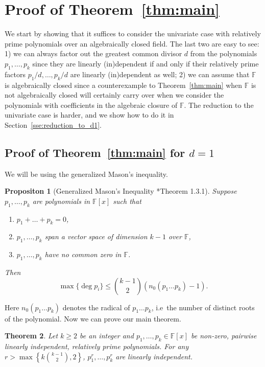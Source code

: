 \documentclass{amsart}
\newtheorem{theorem}{Theorem}
\newtheorem{proposition}[theorem]{Propositon}
\theoremstyle{definition}
\theoremstyle{remark}
\numberwithin{equation}{section}
\newcommand{\F}{\mathbb{F}}
\begin{document}
\section{Proof of Theorem~\ref{thm:main}}
\label{section:proof}

We start by showing that it suffices to consider the univariate case with
relatively prime polynomials over an algebraically closed field. The last two
are easy to see: 1) we can always factor out the greatest common divisor $ d $
from the polynomials $ p_1, \ldots, p_k $ since they are linearly (in)dependent
if and only if their relatively prime factors $ p_1/d, \ldots, p_k/d $ are
linearly (in)dependent as well; 2) we can assume that $ \F $ is algebraically
closed since a counterexample to Theorem~\ref{thm:main} when $ \F $ is not
algebraically closed will certainly carry over when we consider the polynomials
with coefficients in the algebraic closure of $ \F $. The reduction to the
univariate case is harder, and we show how to do it in Section~\ref{sse:reduction_to_d1}. 

\subsection{Proof of Theorem~\ref{thm:main} for $ d=1 $}
\label{sse:proof_for_d1}
We will be using the generalized Mason's inequality.
\begin{proposition}[Generalized Mason's Inequality \cite{Sheppard14}*{Theorem
	1.3.1}]
	\label{prop:mason}
	Suppose $ p_1, \ldots, p_k $ are polynomials in $ \F[x] $ such that
	\begin{enumerate}
		\item
			$ p_1 + \ldots + p_k = 0 $,

		\item
			$ p_1, \ldots, p_k $ span a vector space of dimension $ k-1 $
			over $ \F $,

		\item 
			$ p_1, \ldots, p_k $ have no common zero in $ \F $.
	\end{enumerate}

	Then
	\[
		\max\{ \deg p_i \} \leq  \binom{k-1}{2}(n_0 (p_1\ldots p_k)
		- 1).
	\]
\end{proposition}
Here $ n_0 (p_1\ldots p_k) $ denotes the radical of $ p_1\ldots p_k $, i.e\ the
number of distinct roots of the polynomial. Now we can prove our main 
theorem.
\begin{theorem}
	Let $ k\geq2 $ be an integer and $ p_1, \ldots, p_k \in \F[x] $ be non-zero,
	pairwise linearly independent, relatively prime polynomials. For any $ r >
	\max\left\{ k \binom{k-1}{2}, 2\right\} $, $ p_1^r, \ldots, p_k^r $ are linearly
	independent.
\end{theorem}
\end{document}

